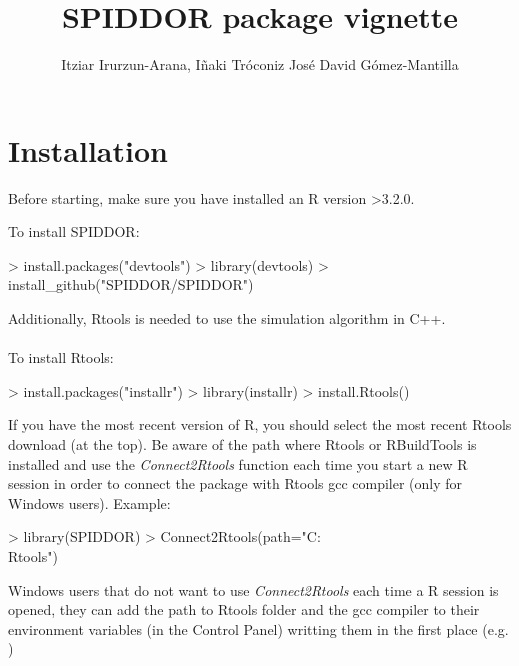 \documentclass[a4paper]{article}
\title{SPIDDOR package vignette}
\author{Itziar Irurzun-Arana, I\~naki Tr\'oconiz Jos\'e David G\'omez-Mantilla}
\begin{document}


\maketitle
\tableofcontents
\clearpage

\section{Installation}
Before starting, make sure you have installed an R version >3.2.0. 

To install SPIDDOR:
\begin{Schunk}
\begin{Sinput}
> install.packages("devtools")
> library(devtools)
> install_github("SPIDDOR/SPIDDOR")
\end{Sinput}
\end{Schunk}

Additionally, Rtools is needed to use the simulation algorithm in C++.\\
\\
To install Rtools:
\begin{Schunk}
\begin{Sinput}
> install.packages("installr")
> library(installr)
> install.Rtools() 
\end{Sinput}
\end{Schunk}
If you have the most recent version of R, you should select the most recent Rtools download (at the top).
Be aware of the path where Rtools or RBuildTools is installed and use the \emph{Connect2Rtools} function each time you start a new R session in order to connect the package with Rtools gcc compiler (only for Windows users). Example:
\begin{Schunk}
\begin{Sinput}
> library(SPIDDOR)
> Connect2Rtools(path="C:\\Rtools")
\end{Sinput}
\end{Schunk}

Windows users that do not want to use \emph{Connect2Rtools} each time a R session is opened, they can add the path to Rtools folder and the gcc compiler to their environment variables (in the Control Panel) writting them in the first place (e.g. )
\end{document}
